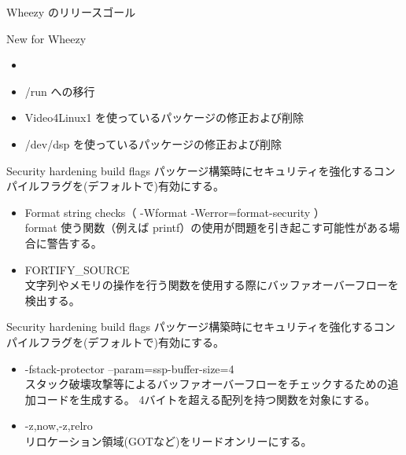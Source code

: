 \begin{frame}{Wheezy のリリースゴール}

New for Wheezy
\begin{itemize}

  \item {\color{red}{Security hardening build flags}}
  \item /run への移行
  \item Video4Linux1 を使っているパッケージの修正および削除
  \item /dev/dsp を使っているパッケージの修正および削除

\end{itemize}

\end{frame}


\begin{frame}{Security hardening build flags}
パッケージ構築時にセキュリティを強化するコンパイルフラグを(デフォルトで)有効にする。

\begin{itemize}
  \item Format string checks（ -Wformat -Werror=format-security ）\\
  format 使う関数（例えば printf）の使用が問題を引き起こす可能性がある場合に警告する。
  \item FORTIFY\_SOURCE \\
  文字列やメモリの操作を行う関数を使用する際にバッファオーバーフローを検出する。

\end{itemize}

\end{frame}



\begin{frame}{Security hardening build flags}
パッケージ構築時にセキュリティを強化するコンパイルフラグを(デフォルトで)有効にする。

\begin{itemize}
  \item -fstack-protector --param=ssp-buffer-size=4 \\
  スタック破壊攻撃等によるバッファオーバーフローをチェックするための追加コードを生成する。
  4バイトを超える配列を持つ関数を対象にする。
  \item -z,now,-z,relro \\
  リロケーション領域(GOTなど)をリードオンリーにする。
\end{itemize}

\end{frame}


